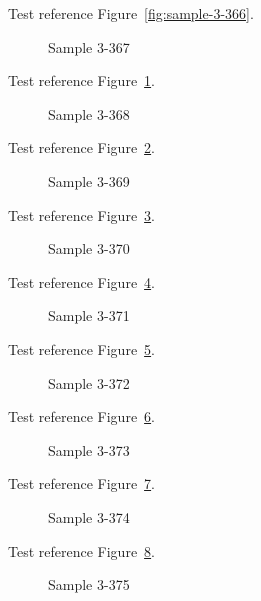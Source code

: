 Test reference Figure~\ref{fig:sample-3-366}.

\begin{figure}[tbhp]
\caption{Sample 3-367}
\label{fig:sample-3-367}
\end{figure}

Test reference Figure~\ref{fig:sample-3-367}.

\begin{figure}[tbhp]
\caption{Sample 3-368}
\label{fig:sample-3-368}
\end{figure}

Test reference Figure~\ref{fig:sample-3-368}.

\begin{figure}[tbhp]
\caption{Sample 3-369}
\label{fig:sample-3-369}
\end{figure}

Test reference Figure~\ref{fig:sample-3-369}.

\begin{figure}[tbhp]
\caption{Sample 3-370}
\label{fig:sample-3-370}
\end{figure}

Test reference Figure~\ref{fig:sample-3-370}.

\begin{figure}[tbhp]
\caption{Sample 3-371}
\label{fig:sample-3-371}
\end{figure}

Test reference Figure~\ref{fig:sample-3-371}.

\begin{figure}[tbhp]
\caption{Sample 3-372}
\label{fig:sample-3-372}
\end{figure}

Test reference Figure~\ref{fig:sample-3-372}.

\begin{figure}[tbhp]
\caption{Sample 3-373}
\label{fig:sample-3-373}
\end{figure}

Test reference Figure~\ref{fig:sample-3-373}.

\begin{figure}[tbhp]
\caption{Sample 3-374}
\label{fig:sample-3-374}
\end{figure}

Test reference Figure~\ref{fig:sample-3-374}.

\begin{figure}[tbhp]
\caption{Sample 3-375}
\label{fig:sample-3-375}
\end{figure}

